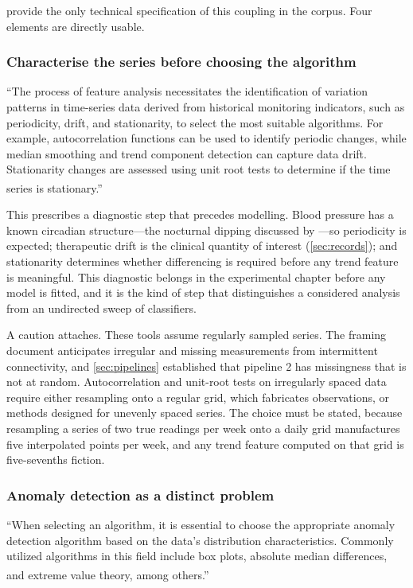 \documentclass[12pt,a4paper,oneside]{report}
\newcommand{\bq}[1]{``#1''\textsuperscript{\dag}}
\begin{document}
\Textcite{liu2025review} provide the only technical specification of this coupling in the corpus. Four elements are directly usable.

\subsubsection{Characterise the series before choosing the algorithm}\label{sec:ts-diagnostics}

\bq{The process of feature analysis necessitates the identification of variation patterns in time-series data derived from historical monitoring indicators, such as periodicity, drift, and stationarity, to select the most suitable algorithms. For example, autocorrelation functions can be used to identify periodic changes, while median smoothing and trend component detection can capture data drift. Stationarity changes are assessed using unit root tests to determine if the time series is stationary.}

This prescribes a diagnostic step that precedes modelling. Blood pressure has a known circadian structure---the nocturnal dipping discussed by \textcite{gafane2024}---so periodicity is expected; therapeutic drift is the clinical quantity of interest (\cref{sec:records}); and stationarity determines whether differencing is required before any trend feature is meaningful. This diagnostic belongs in the experimental chapter before any model is fitted, and it is the kind of step that distinguishes a considered analysis from an undirected sweep of classifiers.

A caution attaches. These tools assume regularly sampled series. The framing document anticipates irregular and missing measurements from intermittent connectivity, and \cref{sec:pipelines} established that pipeline 2 has missingness that is not at random. Autocorrelation and unit-root tests on irregularly spaced data require either resampling onto a regular grid, which fabricates observations, or methods designed for unevenly spaced series. The choice must be stated, because resampling a series of two true readings per week onto a daily grid manufactures five interpolated points per week, and any trend feature computed on that grid is five-sevenths fiction.

\subsubsection{Anomaly detection as a distinct problem}

\bq{When selecting an algorithm, it is essential to choose the appropriate anomaly detection algorithm based on the data's distribution characteristics. Commonly utilized algorithms in this field include box plots, absolute median differences, and extreme value theory, among others.}
\end{document}
